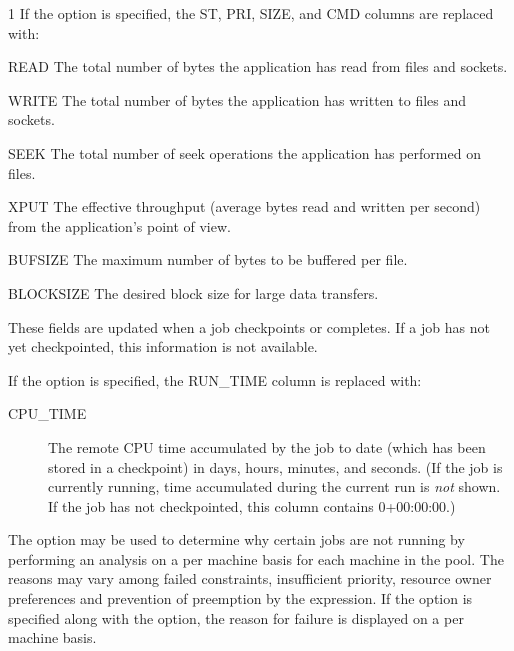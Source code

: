 \begin{ManPage}{\label{man-condor-q}}{1}
If the  option is specified, the ST, PRI, SIZE, and CMD columns
are replaced with:

\begin{description}
\item{READ} The total number of bytes the application has read from files and sockets.
\item{WRITE} The total number of bytes the application has written to files and sockets.
\item{SEEK} The total number of seek operations the application has performed on files.
\item{XPUT} The effective throughput (average bytes read and written per second)
from the application's point of view.
\item{BUFSIZE} The maximum number of bytes to be buffered per file.
\item{BLOCKSIZE} The desired block size for large data transfers.
\end{description}

These fields are updated when a job checkpoints or completes.  If a job
has not yet checkpointed, this information is not available.

If the  option is specified, the RUN\_TIME 
column is replaced with:

\begin{description}
\item[CPU\_TIME] The remote CPU time accumulated by the job to date
(which has been stored in a checkpoint) in days, hours, minutes, and
seconds.  (If the job is currently running, time accumulated during
the current run is \emph{not} shown.  If the job has not checkpointed,
this column contains 0+00:00:00.)
\end{description}

The  option may be used to determine why certain jobs are not
running by performing an analysis on a per machine basis for each machine in 
the pool.  The reasons may vary among failed constraints, insufficient priority,
resource owner preferences and prevention of preemption by the 
 expression.  If the  option is specified 
along with the  option, the reason for failure is displayed on a 
per machine basis.


\end{ManPage}
